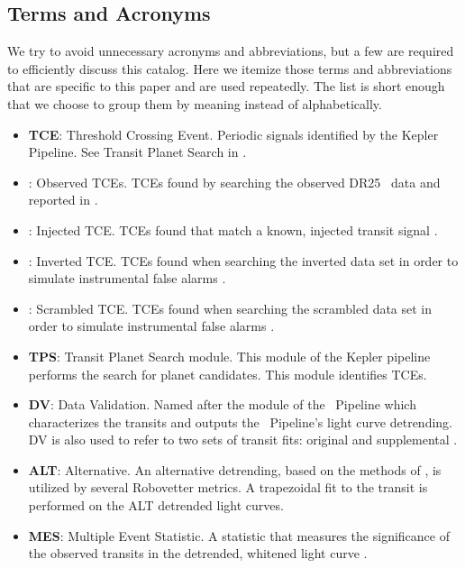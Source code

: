 \subsection{Terms and Acronyms}
\label{abbrev}
We try to avoid unnecessary acronyms and abbreviations, but a few are required to efficiently discuss this catalog.  Here we itemize those terms and abbreviations that are specific to this paper and are used repeatedly. The list is short enough that we choose to group them by meaning instead of alphabetically. 

\begin{itemize}

\item[] \textbf{TCE}: Threshold Crossing Event. Periodic signals identified by the Kepler Pipeline. See Transit Planet Search in \citet{JenkinsKDPH}.
\item[] \textbf{\opstce}: Observed TCEs. TCEs found by searching the observed DR25 \Kepler\ data and reported in \citet{Twicken2016}.
\item[] \textbf{\injtce}: Injected TCE. TCEs found that match a known, injected transit signal \citep{Christiansen2017}.
\item[] \textbf{\invtce}: Inverted TCE. TCEs found when searching the inverted data set in order to simulate instrumental false alarms \citep{Coughlin2017detmetrics}.
\item[] \textbf{\scrtce}: Scrambled TCE. TCEs found when searching the scrambled data set in order to simulate instrumental false alarms \citep{Coughlin2017detmetrics}.
\item[] \textbf{TPS}: Transit Planet Search module. This module of the Kepler pipeline performs the search for planet candidates. This module identifies TCEs.
\item[] \textbf{DV}: Data Validation. Named after the module of the \Kepler\ Pipeline which characterizes the transits and outputs the \Kepler\ Pipeline's light curve detrending. DV is also used to refer to two sets of transit fits: original and supplemental \citet{JenkinsKDPH}.
\item[] \textbf{ALT}: Alternative. An alternative detrending, based on the methods of \citet{Garcia2010}, is utilized by several Robovetter metrics. A trapezoidal fit to the transit is performed on the ALT detrended light curves.
\item[] \textbf{MES}: Multiple Event Statistic. A statistic that measures the significance of the observed transits in the detrended, whitened light curve \citep{Jenkins2002a}.

\end{itemize}
